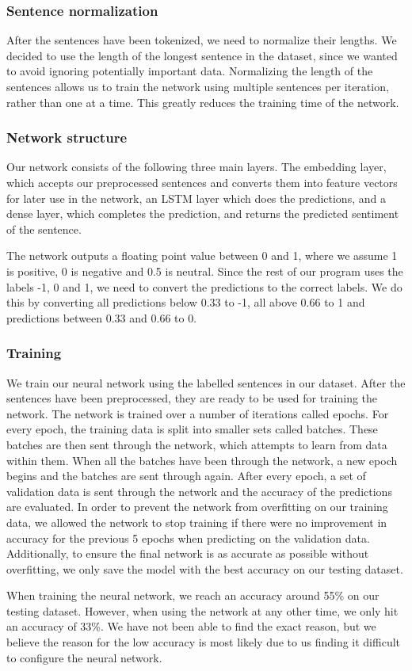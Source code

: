 \subsubsection{Sentence normalization}
After the sentences have been tokenized, we need to normalize their lengths. 
We decided to use the length of the longest sentence in the dataset, since we wanted to avoid ignoring potentially important data.
Normalizing the length of the sentences allows us to train the network using multiple sentences per iteration, rather than one at a time. This greatly reduces the training time of the network.

\subsubsection{Network structure}
Our network consists of the following three main layers. The embedding layer, which accepts our preprocessed sentences and converts them into feature vectors for later use in the network, an LSTM layer which does the predictions, and a dense layer, which completes the prediction, and returns the predicted sentiment of the sentence.

The network outputs a floating point value between 0 and 1, where we assume 1 is positive, 0 is negative and 0.5 is neutral.
Since the rest of our program uses the labels -1, 0 and 1, we need to convert the predictions to the correct labels. We do this by converting all predictions below 0.33 to -1, all above 0.66 to 1 and predictions between 0.33 and 0.66 to 0.

\subsubsection{Training} \label{training}
We train our neural network using the labelled sentences in our dataset. After the sentences have been preprocessed, they are ready to be used for training the network.
The network is trained over a number of iterations called epochs. For every epoch, the training data is split into smaller sets called batches. These batches are then sent through the network, which attempts to learn from data within them. When all the batches have been through the network, a new epoch begins and the batches are sent through again.
After every epoch, a set of validation data is sent through the network and the accuracy of the predictions are evaluated. In order to prevent the network from overfitting on our training data, we allowed the network to stop training if there were no improvement in accuracy for the previous 5 epochs when predicting on the validation data. Additionally, to ensure the final network is as accurate as possible without overfitting, we only save the model with the best accuracy on our testing dataset.

When training the neural network, we reach an accuracy around 55\% on our testing dataset.
However, when using the network at any other time, we only hit an accuracy of 33\%. We have not been able to find the exact reason, but 
we believe the reason for the low accuracy is most likely due to us finding it difficult to configure the neural network. 
